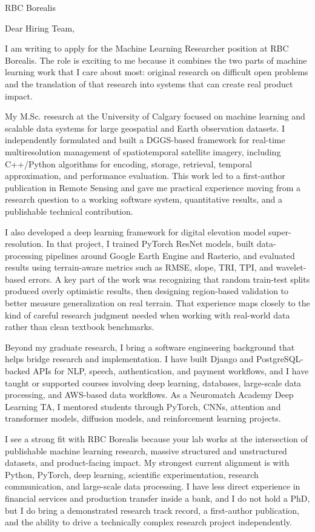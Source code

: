 \documentclass[11pt]{letter}
\begin{document}
\begin{letter}{RBC Borealis}

\opening{Dear Hiring Team,}

I am writing to apply for the Machine Learning Researcher position at RBC Borealis. The role is exciting to me because it combines the two parts of machine learning work that I care about most: original research on difficult open problems and the translation of that research into systems that can create real product impact.

My M.Sc. research at the University of Calgary focused on machine learning and scalable data systems for large geospatial and Earth observation datasets. I independently formulated and built a DGGS-based framework for real-time multiresolution management of spatiotemporal satellite imagery, including C++/Python algorithms for encoding, storage, retrieval, temporal approximation, and performance evaluation. This work led to a first-author publication in Remote Sensing and gave me practical experience moving from a research question to a working software system, quantitative results, and a publishable technical contribution.

I also developed a deep learning framework for digital elevation model super-resolution. In that project, I trained PyTorch ResNet models, built data-processing pipelines around Google Earth Engine and Rasterio, and evaluated results using terrain-aware metrics such as RMSE, slope, TRI, TPI, and wavelet-based errors. A key part of the work was recognizing that random train-test splits produced overly optimistic results, then designing region-based validation to better measure generalization on real terrain. That experience maps closely to the kind of careful research judgment needed when working with real-world data rather than clean textbook benchmarks.

Beyond my graduate research, I bring a software engineering background that helps bridge research and implementation. I have built Django and PostgreSQL-backed APIs for NLP, speech, authentication, and payment workflows, and I have taught or supported courses involving deep learning, databases, large-scale data processing, and AWS-based data workflows. As a Neuromatch Academy Deep Learning TA, I mentored students through PyTorch, CNNs, attention and transformer models, diffusion models, and reinforcement learning projects.

I see a strong fit with RBC Borealis because your lab works at the intersection of publishable machine learning research, massive structured and unstructured datasets, and product-facing impact. My strongest current alignment is with Python, PyTorch, deep learning, scientific experimentation, research communication, and large-scale data processing. I have less direct experience in financial services and production transfer inside a bank, and I do not hold a PhD, but I do bring a demonstrated research track record, a first-author publication, and the ability to drive a technically complex research project independently.


\end{letter}
\end{document}
